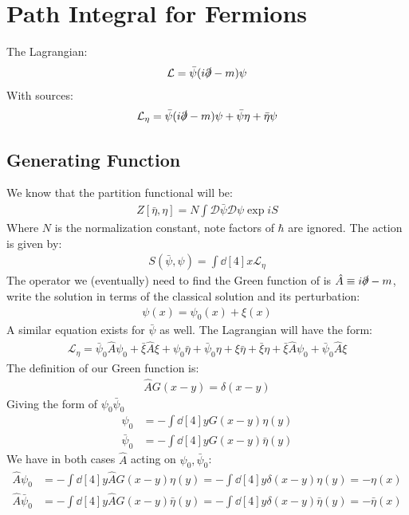 \documentclass[12pt]{article}
\renewcommand{\L}{\mathcal{L}}
\newcommand{\cD}{\mathcal{D}}
\newcommand{\D}{\partial}
\newcommand{\psib}{\bar{\psi}}
\newcommand{\etab}{\bar{\eta}}
\newcommand{\xib}{\bar{\xi}}
\newcommand{\A}{\hat{A}}
\begin{document}
\section{Path Integral for Fermions}
The Lagrangian:
\begin{align*}
  \L=\psib(i\slashed{\D}-m)\psi
\end{align*}
With sources:
\begin{align*}
  \L_\eta=\psib(i\slashed{\D}-m)\psi+\psib\eta+\etab\psi
\end{align*}
\subsection{Generating Function}
We know that the partition functional will be:
\begin{align*}
  Z[\etab,\eta]=N\int\cD\psib\cD\psi \exp{iS}
\end{align*}
Where $N$ is the normalization constant, note factors of $\hbar$ are ignored. The action is given by:
\begin{align*}
  S(\psib,\psi)=\int\dd[4]{x}\L_\eta
\end{align*}
The operator we (eventually) need to find the Green function of is $\A\equiv i\slashed{\D}-m$, write the solution in terms of the classical solution and its perturbation:
\begin{align*}
  \psi(x)=\psi_0(x)+\xi(x)
\end{align*}
A similar equation exists for $\psib$ as well. The Lagrangian will have the form:
\begin{align*}
  \L_\eta=\psib_0\A\psi_0+\xib\A\xi+
  \psi_0\etab+\psib_0\eta+\xi\etab+\xib\eta+
  \xib\A\psi_0+\psib_0\A\xi
\end{align*}
The definition of our Green function is:
\begin{align*}
  \A G(x-y)=\delta(x-y)
\end{align*}
Giving the form of $\psi_0\psib_0$
\begin{align*}
  \psi_0&=-\int\dd[4]{y}G(x-y)\eta(y)\\
  \psib_0&=-\int\dd[4]{y}G(x-y)\etab(y)
\end{align*}
We have in both cases $\A$ acting on $\psi_0,\psib_0$:
\begin{align*}
  \A\psi_0&=-\int\dd[4]{y}\A G(x-y)\eta(y)
  =-\int\dd[4]{y}\delta(x-y)\eta(y)=-\eta(x)\\
  \A\psib_0&=-\int\dd[4]{y}\A G(x-y)\etab(y)
  =-\int\dd[4]{y}\delta(x-y)\etab(y)=-\etab(x)
\end{align*}
\end{document}
